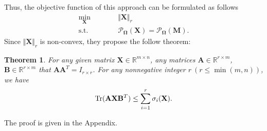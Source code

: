 \documentclass{article}
\newtheorem{theorem}{Theorem}[section]
\begin{document}
{Thus, the objective function of this approach can be formulated as follows
\begin{equation}
    \begin{aligned}
        \min_{\mathbf X}\qquad&\quad \Vert\mathbf X \Vert_r \\
        \text{s.t.}\qquad&\quad  \mathcal{P}_{\mathbf\Omega}(\mathbf X) =  \mathcal{P}_{\mathbf\Omega}(\mathbf M).
    \end{aligned}\label{obj0}
\end{equation}
Since $\Vert\mathbf X \Vert_r$ is non-convex, they propose the follow theorem:
\begin{theorem}
    For any given matrix $\mathbf X \in \mathbb{R}^{m \times n}$, any matrices $\mathbf A \in \mathbb{R}^{r \times m}$, $\mathbf B \in \mathbb{R}^{r \times m}$ that $\mathbf A\mathbf A^T = I_{r \times r}$. For any nonnegative integer $r \ (r \leq \min(m,n))$, we have 
    \begin{equation}
        \text{\rm Tr}(\mathbf A\mathbf X\mathbf B^T) \leq \sum_{i=1}^r \sigma_i(\mathbf X).
        \label{eq31}
    \end{equation}
    \label{thm31}
\end{theorem}
The proof is given in the Appendix.

}
\end{document}
